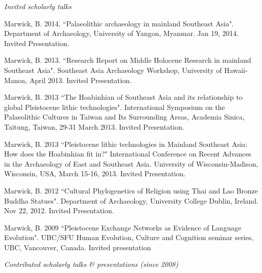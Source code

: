 

\medskip

\noindent\emph{Invited scholarly talks \vspace{0.01in}}

\medskip

\ind Marwick, B. 2014. ``Palaeolithic archaeology in mainland Southeast Asia". Department of Archaeology, University of Yangon, Myanmar. Jan 19, 2014. Invited Presentation.

\ind Marwick, B. 2013. ``Research Report on Middle Holocene Research in mainland Southeast Asia". Southeast Asia Archaeology Workshop, University of Hawaii-Manoa, April 2013. Invited Presentation.

\ind Marwick, B. 2013 ``The Hoabinhian of Southeast Asia and its relationship to global Pleistocene lithic technologies". International Symposium on the Palaeolithic Cultures in Taiwan and Its Surrounding Areas, Academia Sinica, Taitung, Taiwan, 29-31 March 2013.  Invited Presentation.

\ind Marwick, B. 2013 ``Pleistocene lithic technologies in Mainland Southeast Asia: How does the Hoabinhian fit in?"  International Conference on Recent Advances in the Archaeology of East and Southeast Asia. University of Wisconsin-Madison, Wisconsin, USA, March 15-16, 2013. Invited Presentation.

\ind Marwick, B. 2012 ``Cultural Phylogenetics of Religion using Thai and Lao Bronze Buddha Statues". Department of Archaeology, University College Dublin, Ireland. Nov 22, 2012. Invited Presentation.

\ind Marwick, B. 2009 ``Pleistocene Exchange Networks as Evidence of Language Evolution".  UBC/SFU Human Evolution, Culture and Cognition seminar series, UBC, Vancouver, Canada. Invited presentation

\bigskip



\noindent\emph{Contributed scholarly talks \& presentations (since 2008)\vspace{0.01in}}

